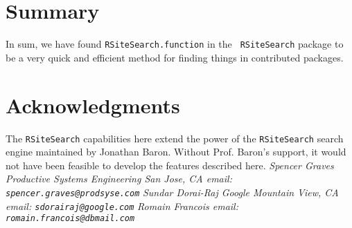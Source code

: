 \section*{Summary}
In sum, we have found {\tt RSiteSearch.function} in the {\tt
RSiteSearch} package to be a very quick and efficient method for
finding things in contributed packages.

\section*{Acknowledgments}
The {\tt RSiteSearch} capabilities here extend the power of the
{\tt RSiteSearch} search engine maintained by Jonathan Baron.
Without Prof. Baron's support, it would not have been feasible
to develop the features described here.
\newline \newline
\emph{Spencer Graves \newline
Productive Systems Engineering \newline
San Jose, CA \newline
email:  {\tt spencer.graves@prodsyse.com} }
\newline \newline
\emph{Sundar Dorai-Raj \newline
Google \newline
Mountain View, CA \newline
email:  {\tt sdorairaj@google.com} }
\newline \newline
\emph{Romain Francois \newline
\newline
\newline
email:  {\tt romain.francois@dbmail.com} }

